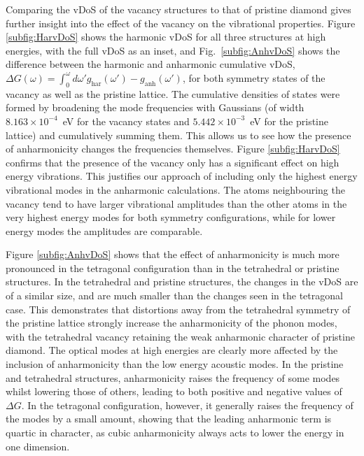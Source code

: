 \documentclass[aps,showpacs,prb,reprint,superscriptaddress,longbibliography]{revtex4-1}
\begin{document}
Comparing the vDoS of the vacancy structures to that of pristine
diamond gives further insight into the effect of the vacancy on the
vibrational properties. Figure \ref{subfig:HarvDoS} shows the harmonic
vDoS for all three structures at high energies, with the full vDoS as
an inset, and Fig.\ \ref{subfig:AnhvDoS} shows the difference between
the harmonic and anharmonic cumulative vDoS,
$\Delta G(\omega)=\int^\omega_0 d\omega'
g_{\text{har}}(\omega')-g_{\text{anh}}(\omega')$,
for both symmetry states of the vacancy as well as the pristine
lattice.  The cumulative densities of states were formed by broadening
the mode frequencies with Gaussians (of width $8.163\times 10^{-4}$~eV
for the vacancy states and $5.442\times 10^{-3}$~eV for the pristine
lattice) and cumulatively summing them.  This allows us to see how the
presence of anharmonicity changes the frequencies themselves. Figure
\ref{subfig:HarvDoS} confirms that the presence of the vacancy only
has a significant effect on high energy vibrations. This justifies our
approach of including only the highest energy vibrational modes in the
anharmonic calculations. The atoms neighbouring the vacancy tend to
have larger vibrational amplitudes than the other atoms in the very
highest energy modes for both symmetry configurations, while for lower
energy modes the amplitudes are comparable.

Figure \ref{subfig:AnhvDoS} shows that the effect of anharmonicity is 
much more pronounced in the tetragonal configuration than in the 
tetrahedral or pristine structures. In the tetrahedral and pristine 
structures, the changes in the vDoS are of a similar size, and are much 
smaller than the changes seen in the tetragonal case. This demonstrates 
that distortions away from the tetrahedral symmetry of the 
pristine lattice strongly increase the anharmonicity of the phonon modes, 
with the tetrahedral vacancy retaining the weak anharmonic character 
of pristine diamond. The optical modes at high energies are clearly 
more affected by the inclusion of anharmonicity than the low energy 
acoustic modes. In the pristine and tetrahedral structures, 
anharmonicity raises the frequency of some modes whilst lowering those 
of others, leading to both positive and negative values of $\Delta G$. 
In the tetragonal configuration, however, it generally raises the 
frequency of the modes by a small amount, showing that the leading 
anharmonic term is quartic in character, as cubic anharmonicity always 
acts to lower the energy in one dimension.\cite{monserrat_anharmonic_2013}
\end{document}
